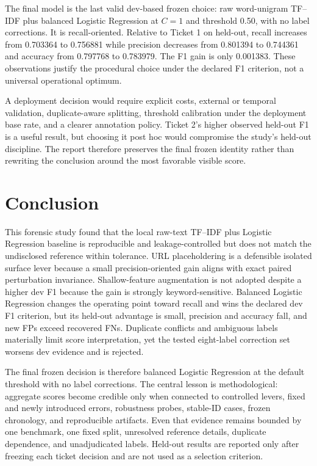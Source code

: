 \documentclass[conference]{IEEEtran}
\begin{document}
The final model is the last valid dev-based frozen choice: raw word-unigram TF--IDF plus balanced Logistic Regression at $C=1$ and threshold 0.50, with no label corrections. It is recall-oriented. Relative to Ticket 1 on held-out, recall increases from 0.703364 to 0.756881 while precision decreases from 0.801394 to 0.744361 and accuracy from 0.797768 to 0.783979. The F1 gain is only 0.001383. These observations justify the procedural choice under the declared F1 criterion, not a universal operational optimum.

A deployment decision would require explicit costs, external or temporal validation, duplicate-aware splitting, threshold calibration under the deployment base rate, and a clearer annotation policy. Ticket 2's higher observed held-out F1 is a useful result, but choosing it post hoc would compromise the study's held-out discipline. The report therefore preserves the final frozen identity rather than rewriting the conclusion around the most favorable visible score.

\section{Conclusion}

This forensic study found that the local raw-text TF--IDF plus Logistic Regression baseline is reproducible and leakage-controlled but does not match the undisclosed reference within tolerance. URL placeholdering is a defensible isolated surface lever because a small precision-oriented gain aligns with exact paired perturbation invariance. Shallow-feature augmentation is not adopted despite a higher dev F1 because the gain is strongly keyword-sensitive. Balanced Logistic Regression changes the operating point toward recall and wins the declared dev F1 criterion, but its held-out advantage is small, precision and accuracy fall, and new FPs exceed recovered FNs. Duplicate conflicts and ambiguous labels materially limit score interpretation, yet the tested eight-label correction set worsens dev evidence and is rejected.

The final frozen decision is therefore balanced Logistic Regression at the default threshold with no label corrections. The central lesson is methodological: aggregate scores become credible only when connected to controlled levers, fixed and newly introduced errors, robustness probes, stable-ID cases, frozen chronology, and reproducible artifacts. Even that evidence remains bounded by one benchmark, one fixed split, unresolved reference details, duplicate dependence, and unadjudicated labels. Held-out results are reported only after freezing each ticket decision and are not used as a selection criterion.
\end{document}
